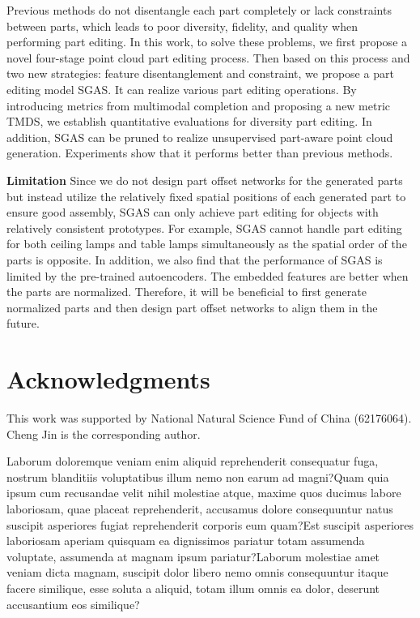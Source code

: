 \documentclass[letterpaper]{article} %
\begin{document}
Previous methods do not disentangle each part completely or lack constraints between parts, which leads to poor diversity, fidelity, and quality when performing part editing. In this work, to solve these problems, we first propose a novel four-stage point cloud part editing process. Then based on this process and two new strategies: feature disentanglement and constraint, we propose a part editing model SGAS. It can realize various part editing operations. By introducing metrics from multimodal completion and proposing a new metric TMDS, we establish quantitative evaluations for diversity part editing. In addition, SGAS can be pruned to realize unsupervised part-aware point cloud generation. Experiments show that it performs better than previous methods.

\noindent \textbf{Limitation} Since we do not design part offset networks for the generated parts but instead utilize the relatively fixed spatial positions of each generated part to ensure good assembly, SGAS can only achieve part editing for objects with relatively consistent prototypes. For example, SGAS cannot handle part editing for both ceiling lamps and table lamps simultaneously as the spatial order of the parts is opposite. In addition, we also find that the performance of SGAS is limited by the pre-trained autoencoders. The embedded features are better when the parts are normalized. Therefore, it will be beneficial to first generate normalized parts and then design part offset networks to align them in the future.

\section{Acknowledgments}

This work was supported by National Natural Science Fund of China (62176064). Cheng Jin is the corresponding author.

Laborum doloremque veniam enim aliquid reprehenderit consequatur fuga, nostrum blanditiis voluptatibus illum nemo non earum ad magni?Quam quia ipsum cum recusandae velit nihil molestiae atque, maxime quos ducimus labore laboriosam, quae placeat reprehenderit, accusamus dolore consequuntur natus suscipit asperiores fugiat reprehenderit corporis eum quam?Est suscipit asperiores laboriosam aperiam quisquam ea dignissimos pariatur totam assumenda voluptate, assumenda at magnam ipsum pariatur?Laborum molestiae amet veniam dicta magnam, suscipit dolor libero nemo omnis consequuntur itaque facere similique, esse soluta a aliquid, totam illum omnis ea dolor, deserunt accusantium eos similique?\clearpage

\end{document}
